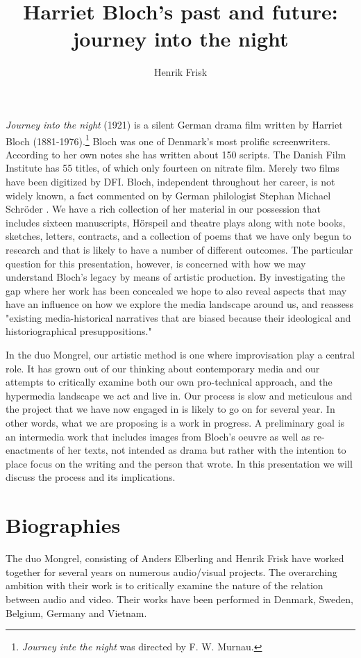 \documentclass[11pt]{article}
\author{Henrik Frisk}
\date{}
\title{Harriet Bloch's past and future: journey into the night}
\begin{document}
\maketitle
\emph{Journey into the night} (1921) is a silent German drama film
written by Harriet Bloch (1881-1976).\footnote{\emph{Journey inte the night}
  was directed by F. W. Murnau.} Bloch was one of Denmark's most prolific
screenwriters. According to her own notes she has written about 150
scripts. The Danish Film Institute has 55 titles, of which only
fourteen on nitrate film. Merely two films have been digitized by
DFI. Bloch, independent throughout her career, is not widely known, a
fact commented on by German philologist Stephan Michael Schröder
\citep{Schroder2011}. We have a rich collection of her material in our
possession that includes sixteen manuscripts, Hörspeil and theatre
plays along with note books, sketches, letters, contracts, and a
collection of poems that we have only begun to research and that is
likely to have a number of different outcomes. The particular question
for this presentation, however, is concerned with how we may
understand Bloch's legacy by means of artistic production. By
investigating the gap where her work has been concealed we hope to
also reveal aspects that may have an influence on how we explore the
media landscape around us, and reassess "existing media-historical
narratives that are biased because their ideological and
historiographical presuppositions." \citep{Huhtamo2013}

In the duo Mongrel, our artistic method is one where improvisation
play a central role. It has grown out of our thinking about
contemporary media and our attempts to critically examine both our own
pro-technical approach, and the hypermedia landscape we act and live
in. Our process is slow and meticulous and the project that we have
now engaged in is likely to go on for several year. In other words,
what we are proposing is a work in progress. A preliminary goal is an
intermedia work that includes images from Bloch's oeuvre as well as
re-enactments of her texts, not intended as drama but rather with the
intention to place focus on the writing and the person that wrote. In this presentation
we will discuss the process and its implications.

\printbibliography

\section*{Biographies}
\label{sec:org6bf825c}
The duo Mongrel, consisting of Anders Elberling and Henrik Frisk have worked together for several years on numerous audio/visual projects. The overarching ambition with their work is to critically examine the nature of the relation between audio and video. Their works have been performed in Denmark, Sweden, Belgium, Germany and Vietnam.
\end{document}

